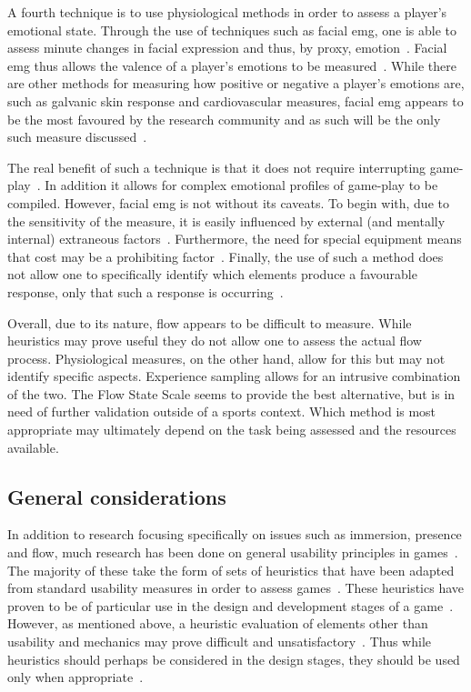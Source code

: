 A fourth technique is to use physiological methods in order to assess a player's emotional state. Through the use of techniques such as facial \gls{emg}, one is able to assess minute changes in facial expression and thus, by proxy, emotion~\citep{Hazl06}. Facial \gls{emg} thus allows the valence of a player's emotions to be measured~\citep{Mand06}. While there are other methods for measuring how positive or negative a player's emotions are, such as galvanic skin response and cardiovascular measures, facial \gls{emg} appears to be the most favoured by the research community and as such will be the only such measure discussed~\citep{Mand06}. 

The real benefit of such a technique is that it does not require interrupting game-play~\citep{Mand06}. In addition it allows for complex emotional profiles of game-play to be compiled. However, facial \gls{emg} is not without its caveats. To begin with, due to the sensitivity of the measure, it is easily influenced by external (and mentally internal) extraneous factors~\citep{Hazl06}. Furthermore, the need for special equipment means that cost may be a prohibiting factor~\citep{Blak10}. Finally, the use of such a method does not allow one to specifically identify which elements produce a favourable response, only that such a response is occurring~\citep{Hazl06}.

Overall, due to its nature, flow appears to be difficult to measure. While heuristics may prove useful they do not allow one to assess the actual flow process. Physiological measures, on the other hand, allow for this but may not identify specific aspects. Experience sampling allows for an intrusive combination of the two. The Flow State Scale seems to provide the best alternative, but is in need of further validation outside of a sports context. Which method is most appropriate may ultimately depend on the task being assessed and the resources available.


\subsection{General considerations}
In addition to research focusing specifically on issues such as immersion, presence and flow, much research has been done on general usability principles in games~\citep{Swee05}. The majority of these take the form of sets of heuristics that have been adapted from standard usability measures in order to assess games~\citep{Fede02}. These heuristics have proven to be of particular use in the design and development stages of a game~\citep{Desu04}. However, as mentioned above, a heuristic evaluation of elements other than usability and mechanics may prove difficult and unsatisfactory~\citep{Mand06}. Thus while heuristics should perhaps be considered in the design stages, they should be used only when appropriate~\citep{Swee05}.

